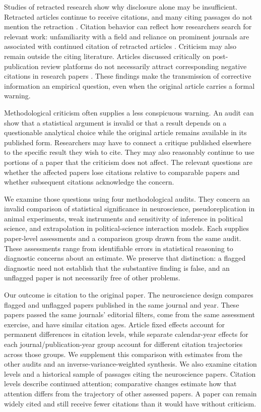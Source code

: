 \documentclass[11pt,letterpaper]{article}
\begin{document}
Studies of retracted research show why disclosure alone may be insufficient. Retracted articles continue to receive citations, and many citing passages do not mention the retraction \citep{hsiao2021}. Citation behavior can reflect how researchers search for relevant work: unfamiliarity with a field and reliance on prominent journals are associated with continued citation of retracted articles \citep{woo2024}. Criticism may also remain outside the citing literature. Articles discussed critically on post-publication review platforms do not necessarily attract corresponding negative citations in research papers \citep{bordignon2020}. These findings make the transmission of corrective information an empirical question, even when the original article carries a formal warning.

Methodological criticism often supplies a less conspicuous warning. An audit can show that a statistical argument is invalid or that a result depends on a questionable analytical choice while the original article remains available in its published form. Researchers may have to connect a critique published elsewhere to the specific result they wish to cite. They may also reasonably continue to use portions of a paper that the criticism does not affect. The relevant questions are whether the affected papers lose citations relative to comparable papers and whether subsequent citations acknowledge the concern.

We examine those questions using four methodological audits. They concern an invalid comparison of statistical significance in neuroscience, pseudoreplication in animal experiments, weak instruments and sensitivity of inference in political science, and extrapolation in political-science interaction models. Each supplies paper-level assessments and a comparison group drawn from the same audit. These assessments range from identifiable errors in statistical reasoning to diagnostic concerns about an estimate. We preserve that distinction: a flagged diagnostic need not establish that the substantive finding is false, and an unflagged paper is not necessarily free of other problems.

Our outcome is citation to the original paper. The neuroscience design compares flagged and unflagged papers published in the same journal and year. These papers passed the same journals' editorial filters, come from the same assessment exercise, and have similar citation ages. Article fixed effects account for permanent differences in citation levels, while separate calendar-year effects for each journal/publication-year group account for different citation trajectories across those groups. We supplement this comparison with estimates from the other audits and an inverse-variance-weighted synthesis. We also examine citation levels and a historical sample of passages citing the neuroscience papers. Citation levels describe continued attention; comparative changes estimate how that attention differs from the trajectory of other assessed papers. A paper can remain widely cited and still receive fewer citations than it would have without criticism.
\end{document}
